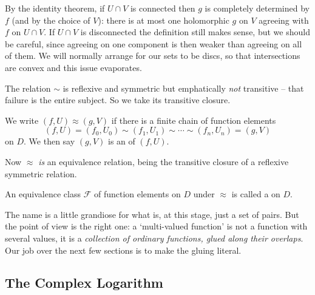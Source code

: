 \begin{center}
\end{center}

By the identity theorem, if $U \cap V$ is connected then $g$ is completely determined by
$f$ (and by the choice of $V$): there is at most one holomorphic $g$ on $V$ agreeing with
$f$ on $U \cap V$. If $U \cap V$ is disconnected the definition still makes sense, but we
should be careful, since agreeing on one component is then weaker than agreeing on all of
them. We will normally arrange for our sets to be discs, so that intersections are convex
and this issue evaporates.

The relation $\sim$ is reflexive and symmetric but emphatically \emph{not} transitive --
that failure is the entire subject. So we take its transitive closure.

\begin{definition}
	We write $(f, U) \approx (g, V)$ if there is a finite chain of function elements
	$$
	(f, U) = (f_0, U_0) \sim (f_1, U_1) \sim \cdots \sim (f_n, U_n) = (g, V)
	$$
	on $D$. We then say $(g,V)$ is an  of $(f,U)$.
\end{definition}

Now $\approx$ \emph{is} an equivalence relation, being the transitive closure of a
reflexive symmetric relation.

\begin{definition}
	An equivalence class $\mathcal{F}$ of function elements on $D$ under $\approx$ is
	called a  on $D$.
\end{definition}

The name is a little grandiose for what is, at this stage, just a set of pairs. But the
point of view is the right one: a `multi-valued function' is not a function with several
values, it is a \emph{collection of ordinary functions, glued along their overlaps}. Our
job over the next few sections is to make the gluing literal.

\subsection{The Complex Logarithm}\label{subsec:logelements}

